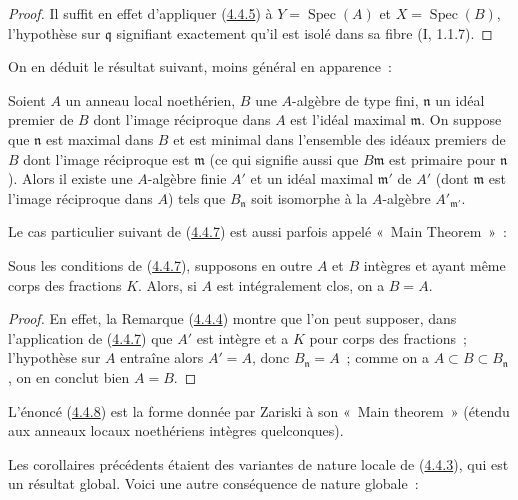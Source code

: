 \begin{proof}
Il suffit en effet d'appliquer (\hyperref[III.4.4.5-fr]{4.4.5}) à
$Y=\operatorname{Spec}(A)$ et $X=\operatorname{Spec}(B)$, l'hypothèse sur
$\mathfrak q$ signifiant exactement qu'il est isolé dans sa fibre
(I, 1.1.7).
\end{proof}

On en déduit le résultat suivant, moins général en apparence~:

\begin{corollary}[4.4.7]
\label{III.4.4.7-fr}
Soient $A$ un anneau local noethérien, $B$ une $A$-algèbre de type fini,
$\mathfrak n$ un idéal premier de $B$ dont l'image réciproque dans $A$ est
l'idéal maximal $\mathfrak m$. On suppose que $\mathfrak n$ est maximal dans
$B$ et est minimal dans l'ensemble des idéaux premiers de $B$ dont l'image
réciproque est $\mathfrak m$ (ce qui signifie aussi que
$B\mathfrak m$ est primaire pour $\mathfrak n$). Alors il existe une
$A$-algèbre finie $A'$ et un idéal maximal $\mathfrak m'$ de $A'$ (dont
$\mathfrak m$ est l'image réciproque dans $A$) tels que $B_{\mathfrak n}$
soit isomorphe à la $A$-algèbre $A'_{\mathfrak m'}$.
\end{corollary}

Le cas particulier suivant de (\hyperref[III.4.4.7-fr]{4.4.7}) est aussi
parfois appelé «~Main Theorem~»~:

\begin{corollary}[4.4.8]
\label{III.4.4.8-fr}
Sous les conditions de (\hyperref[III.4.4.7-fr]{4.4.7}), supposons en outre
$A$ et $B$ intègres et ayant même corps des fractions $K$. Alors, si $A$ est
intégralement clos, on a $B=A$.
\end{corollary}

\begin{proof}
En effet, la Remarque (\hyperref[III.4.4.4-fr]{4.4.4}) montre que l'on peut
supposer, dans l'application de (\hyperref[III.4.4.7-fr]{4.4.7}) que $A'$ est
intègre et a $K$ pour corps des fractions~; l'hypothèse sur $A$ entraîne alors
$A'=A$, donc $B_{\mathfrak n}=A$~; comme on a
$A\subset B\subset B_{\mathfrak n}$, on en conclut bien $A=B$.
\end{proof}

L'énoncé (\hyperref[III.4.4.8-fr]{4.4.8}) est la forme donnée par Zariski à
son «~Main theorem~» (étendu aux anneaux locaux noethériens intègres
quelconques).

Les corollaires précédents étaient des variantes de nature locale de
(\hyperref[III.4.4.3-fr]{4.4.3}), qui est un résultat global. Voici une autre
conséquence de nature globale~:

